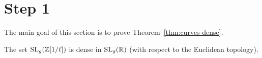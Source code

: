 \documentclass{amsart}
\begin{document}

\section{Step 1}
\label{sec:step-1}

The main goal of this section is to prove Theorem~\ref{thm:curves-dense}.

\begin{lemma}\label{lemma:sl-z-1overl-dense-sl-r}
  The set $\operatorname{SL}_g(\mathbb{Z}[1/\ell])$ is dense in $\operatorname{SL}_g(\mathbb{R})$ (with respect to the Euclidean topology).
\end{lemma}
\end{document}

